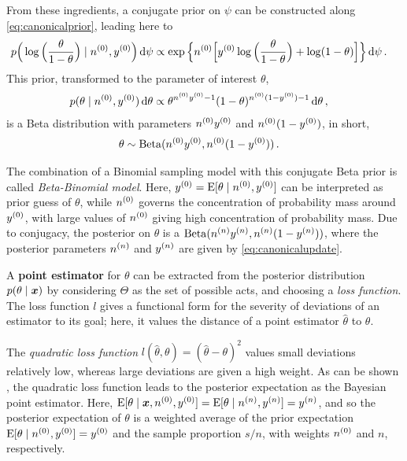 From these ingredients, a conjugate prior on $\psi$ can be constructed along \eqref{eq:canonicalprior},
leading here to
\begin{align*}
p\Big(\log\Big(\frac{\theta}{1-\theta}\Big) \mid \nz, \yz\Big) \dd\psi %
 &\propto \exp\Big\{ \nz \Big[ \yz \log\Big(\frac{\theta}{1-\theta}\Big) + \log(1-\theta) \Big] \Big\} \dd\psi\,.
\end{align*}
This prior, transformed to the parameter of interest $\theta$,
\begin{align*}
p(\theta\mid n^{(0)}, y^{(0)})\,\mathrm{d}\theta &\propto \theta^{n^{(0)}y^{(0)} - 1} (1-\theta)^{n^{(0)}(1-y^{(0)}) - 1} \,\mathrm{d}\theta\,,
\end{align*}
is a Beta distribution with parameters $n^{(0)}y^{(0)}$ and $n^{(0)}(1-y^{(0)})$, in short, %
\begin{align*}
\theta &\sim \operatorname{Beta}(n^{(0)}y^{(0)}, n^{(0)}(1-y^{(0)}))\,.
\end{align*}

The combination of a Binomial sampling model with this conjugate Beta prior is called \emph{Beta-Binomial model}.
Here, $y^{(0)} = \operatorname{E}[\theta\mid n^{(0)}, y^{(0)}]$ can be interpreted as prior guess of $\theta$,
while $n^{(0)}$ governs the concentration of probability mass around $y^{(0)}$,
with large values of $n^{(0)}$ giving high concentration of probability mass.
Due to conjugacy, the posterior on $\theta$ is a $\operatorname{Beta}(n^{(n)}y^{(n)}, n^{(n)}(1-y^{(n)}))$,
where the posterior parameters $n^{(n)}$ and $y^{(n)}$ are given by \eqref{eq:canonicalupdate}.

A \textbf{point estimator} for $\theta$ can be extracted from the posterior distribution $p(\theta\mid{\bm x})$
by considering $\Theta$ as the set of possible acts, and choosing a \emph{loss function}.
The loss function $l$ gives a functional form for the severity of deviations of an estimator to its goal;
here, it values the distance of a point estimator $\hat{\theta}$ to $\theta$.

The \emph{quadratic loss function} $l(\hat{\theta}, \theta) = (\hat{\theta}-\theta)^2$
values small deviations relatively low, whereas large deviations are given a high weight.
As can be shown \parencite[see, e.g.,][pp.~352f]{2002:casella}, %
the quadratic loss function leads to the posterior expectation as the Bayesian point estimator.
Here, $\operatorname{E}[\theta\mid{\bm x}, n^{(0)}, y^{(0)}] = \operatorname{E}[\theta\mid n^{(n)}, y^{(n)}] = y^{(n)}$,
and so the posterior expectation of $\theta$ is a weighted average
of the prior expectation $\operatorname{E}[\theta\mid n^{(0)}, y^{(0)}] = y^{(0)}$ and the sample proportion $s/n$, with weights $n^{(0)}$ and $n$, respectively.

